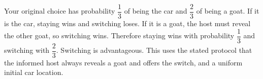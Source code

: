 Your original choice has probability $\dfrac{1}{3}$ of being the car and $\dfrac{2}{3}$ of being a goat. If it is the car, staying wins and switching loses. If it is a goat, the host must reveal the other goat, so switching wins. Therefore staying wins with probability $\boxed{\dfrac{1}{3}}$ and switching with $\boxed{\dfrac{2}{3}}$. Switching is advantageous. This uses the stated protocol that the informed host always reveals a goat and offers the switch, and a uniform initial car location.
